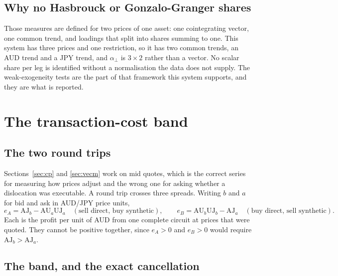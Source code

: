 \documentclass[11pt,a4paper]{article}
\newcommand{\AU}{\mathrm{AU}}
\newcommand{\UJ}{\mathrm{UJ}}
\newcommand{\AJ}{\mathrm{AJ}}
\begin{document}
\subsection{Why no Hasbrouck or Gonzalo-Granger shares}

Those measures are defined for two prices of one asset: one cointegrating vector, one common
trend, and loadings that split into shares summing to one. This system has three prices and
one restriction, so it has two common trends, an AUD trend and a JPY trend, and
$\alpha_{\perp}$ is $3 \times 2$ rather than a vector. No scalar share per leg is identified
without a normalisation the data does not supply. The weak-exogeneity tests are the part of
that framework this system supports, and they are what is reported.

\section{The transaction-cost band}
\label{sec:band}

\subsection{The two round trips}

Sections~\ref{sec:cp} and \ref{sec:vecm} work on mid quotes, which is the correct series for
measuring how prices adjust and the wrong one for asking whether a dislocation was
executable. A round trip crosses three spreads. Writing $b$ and $a$ for bid and ask in
AUD/JPY price units,
\[
e_A = \AJ_b - \AU_a \UJ_a \quad (\text{sell direct, buy synthetic}), \qquad
e_B = \AU_b \UJ_b - \AJ_a \quad (\text{buy direct, sell synthetic}).
\]
Each is the profit per unit of AUD from one complete circuit at prices that were quoted.
They cannot be positive together, since $e_A > 0$ and $e_B > 0$ would require
$\AJ_b > \AJ_a$.

\subsection{The band, and the exact cancellation}
\end{document}
